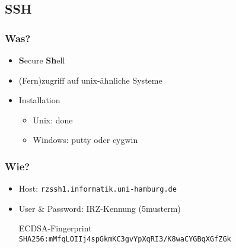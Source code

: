 \documentclass{beamer}
\begin{document}
    \subsection{SSH}
    \begin{frame}
        \frametitle{Was?}
        \begin{itemize}
            \item \textbf{S}ecure \textbf{Sh}ell
            \item (Fern)zugriff auf unix-ähnliche Systeme
            \item Installation
            \begin{itemize}
            \item Unix: done
            \item Windows: putty oder cygwin
            \end{itemize}
        \end{itemize}
    \end{frame}
    \begin{frame}
        \frametitle{Wie?}
        \begin{itemize}
            \item Host: \texttt{rzssh1.informatik.uni-hamburg.de}
            \item User \& Password: IRZ-Kennung (5musterm)
            \begin{block}{ECDSA-Fingerprint}
                \texttt{SHA256:mMfqLOIIj4spGkmKC3gvYpXqRI3/K8waCYGBqXGfZGk}
            \end{block}
        \end{itemize}
    \end{frame}
\end{document}
